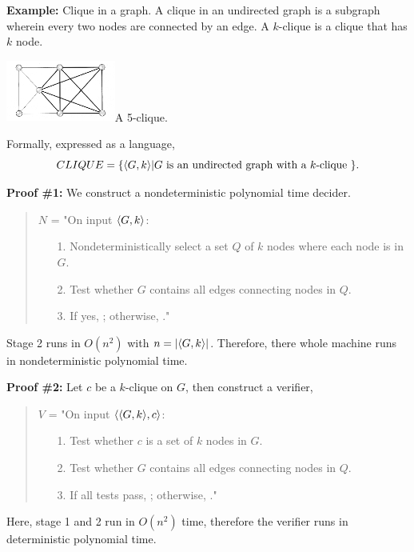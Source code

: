 \documentclass[a4paper,blends,pdf,colorBG,slideColor]{prosper}
\begin{document}
{\bf Example:} Clique in a graph.  A clique in an undirected graph is a subgraph wherein every  two nodes  are connected by an edge.  A $k$-clique is a clique that
has $k$ node.
\begin{center}
\includegraphics[height=20mm]{images/5-clique.eps}{A 5-clique.}
\end{center}
Formally, expressed as a language, \[CLIQUE = \{ \langle {G,k} \rangle| \mbox{$G$ is an undirected graph with a $k$-clique }\}.\]

\es

{

{\bf Proof \#1:} We construct a nondeterministic polynomial time decider.
\begin{quote}
$N$ = "On input $\langle {G,k} \rangle$:
\begin{itemize}
\item[1.] Nondeterministically select a set $Q$ of $k$ nodes where each node is in $G$.
\item[2.] Test whether $G$ contains all edges connecting nodes in $Q$.
\item[3.] If yes, \accept; otherwise, \reject."
\end{itemize}
\end{quote}
Stage 2 runs in $O(n^2)$ with $n = |\langle {G,k} \rangle|$.  Therefore, there whole machine
runs in nondeterministic polynomial time.
}
\es

{\bf Proof \#2:} Let $c$ be a $k$-clique on $G$, then construct a verifier,
\begin{quote}
$V$ = "On input $\langle {\ensuremath{\langle {G,k} \rangle},c} \rangle$:
\begin{itemize}
\item[1.] Test whether $c$ is a set of $k$ nodes in $G$.
\item[2.] Test whether $G$ contains all edges connecting nodes in $Q$.
\item[3.] If all tests pass, \accept; otherwise, \reject."
\end{itemize}
\end{quote}
Here, stage 1 and 2 run in $O(n^2)$ time, therefore the verifier runs in deterministic
polynomial time.
\es

\end{document}

